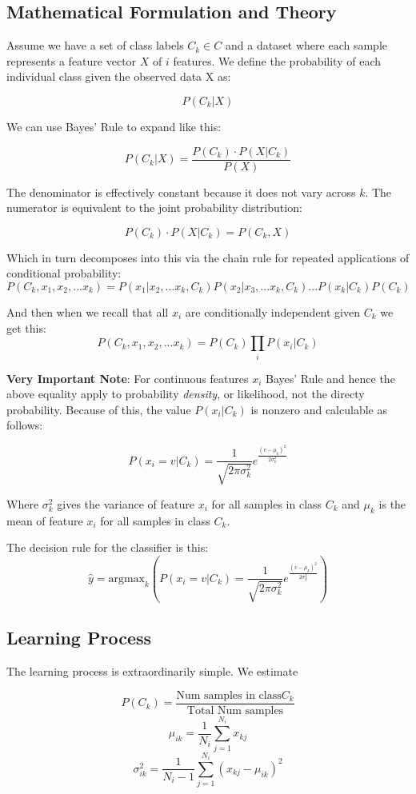 \documentclass[12pt]{article}
\begin{document}
\subsection{Mathematical Formulation and Theory}
Assume we have a set of class labels \(C_k \in C\) and a dataset where each sample represents a feature vector \(X\) of \(i\) features. We define the probability of each individual class given the observed data X as:

\[P(C_k | X)\]

We can use Bayes' Rule to expand like this:

 \[P(C_k | X) = \frac{P(C_k) \cdot P(X | C_k)}{P(X)}\]

The denominator is effectively constant because it does not vary across \(k\). The numerator is equivalent to the joint probability distribution:

\[P(C_k) \cdot P(X | C_k) = P(C_k, X)\]

Which in turn decomposes into this via the chain rule for repeated applications of conditional probability:
\[P(C_k, x_1, x_2, ... x_k) = P(x_1 | x_2, ... x_k, C_k) P(x_2 | x_3, ... x_k, C_k) ... P(x_k | C_k) P(C_k)\]

And then when we recall that all \(x_i\) are conditionally independent given \(C_k\) we get this:
\[P(C_k, x_1, x_2, ... x_k) = P(C_k) \prod_{i}P(x_i|C_k)\]

\textbf{Very Important Note}: For continuous features \(x_i\) Bayes' Rule and hence the above equality apply to probability \textit{density}, or likelihood, not the directy probability. Because of this, the value \(P(x_i|C_k)\) is nonzero and calculable as follows:

\[P(x_i = v|C_k) = \frac{1}{\sqrt{2\pi \sigma^2_k}}e^{\frac{(v - \mu_{k})^2}{2\sigma^2_k}}\]

Where \(\sigma^2_k\) gives the variance of feature \(x_i\) for all samples in class \(C_k\) and \(\mu_k\) is the mean of  feature \(x_i\) for all samples in class \(C_k\).

The decision rule for the classifier is this: 
\[\hat{y} = \text{argmax}_k \left(P(x_i = v|C_k) = \frac{1}{\sqrt{2\pi \sigma^2_k}}e^{\frac{(v - \mu_{k})^2}{2\sigma^2_k}}\right)\]

\subsection{Learning Process}
The learning process is extraordinarily simple. We estimate 

\[P(C_k) = \frac{\text{Num samples in class} C_k}{\text{Total Num samples}}\]
\[\mu_{ik} = \frac{1}{N_i} \sum_{j=1}^{N_i} x_{kj}\]
\[\sigma_{ik}^2 = \frac{1}{N_i - 1} \sum_{j=1}^{N_i} (x_{kj} - \mu_{ik})^2\]
\end{document}
